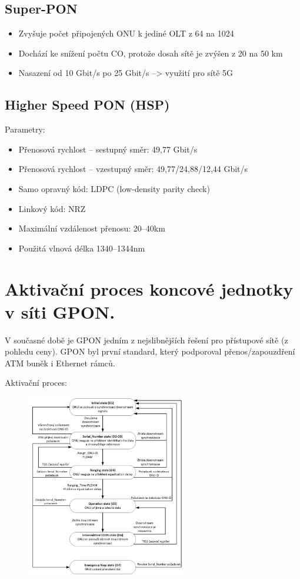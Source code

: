 \subsection{Super-PON}
\begin{itemize}
    \item Zvyšuje počet připojených ONU k jediné OLT z 64 na 1024
    \item Dochází ke snížení počtu CO, protože dosah sítě je zvýšen z 20 na 50 km
    \item Nasazení od 10 Gbit/s po 25 Gbit/s –> využití pro sítě 5G
\end{itemize}

\subsection{Higher Speed PON (HSP)}
Parametry:
\begin{itemize}
    \item Přenosová rychlost – sestupný směr: 49,77 Gbit/s
    \item Přenosová rychlost – vzestupný směr: 49,77/24,88/12,44 Gbit/s
    \item Samo opravný kód: LDPC (low-density parity check)
    \item Linkový kód: NRZ
    \item Maximální vzdálenost přenosu: 20–40km
    \item Použitá vlnová délka 1340–1344nm
\end{itemize}

\clearpage
\section{Aktivační proces koncové jednotky v síti GPON.}
V současné době je GPON jedním z nejslibnějších řešení pro přístupové sítě (z pohledu ceny). GPON byl první standard, který podporoval přenos/zapouzdření ATM buněk i Ethernet rámců.

Aktivační proces:
\begin{figure} [h]
    \centering
    \includegraphics[width=0.63\textwidth]{snimky/proces.png}
    \label{fig:gpon-proces}
\end{figure}

